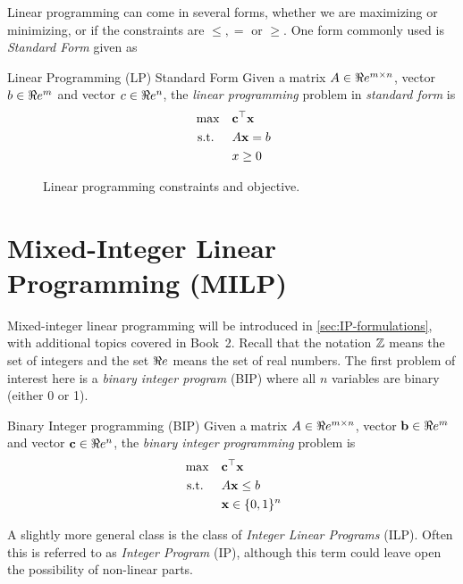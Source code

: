 Linear programming can come in several forms, whether we are maximizing or minimizing, or if the constraints are $\leq, =$ or $\geq$.   One form commonly used is \emph{Standard Form} given as 
\begin{general}{Linear Programming (LP) Standard Form}{\polynomial}
Given a matrix $A \in \Re e^{m\times n}$, vector $b \in \Re e^m$ and vector $c \in \Re e^n$, the \emph{linear programming} problem in \emph{standard form} is
\begin{equation}
\label{eq:standardLP}
\begin{split}
\max \quad & \mathbf{c}^\top \mathbf{x}\\
\mbox{ s.t. }  \quad & A\mathbf{x} = b\\
& x \geq 0
\end{split}
\end{equation}
\end{general}

\begin{figure}
\caption{Linear programming constraints and objective.}
\end{figure}

\section{Mixed-Integer Linear Programming (MILP)}
\label{sec:intro-MILP}
Mixed-integer linear programming will be introduced in \autoref{sec:IP-formulations}, with additional topics covered in Book~2.
Recall that the notation $\mathbb{Z}$ means the set of integers and the set $\Re e$ means the set of real numbers.  The first problem of interest here is a \emph{binary integer program} (BIP) where all $n$ variables are binary (either 0 or 1).

\begin{general}{Binary Integer programming (BIP)}{\npcomplete}
Given a matrix $A \in \Re e^{m\times n}$, vector $\mathbf{b} \in \Re e^m$ and vector $\mathbf{c} \in \Re e^n$, the \emph{binary integer programming} problem is
\begin{equation}
\label{eq:BIP}
\begin{split}
\max \quad & \mathbf{c}^\top \mathbf{x}\\
\mbox{ s.t. }  \quad & A\mathbf{x} \leq b\\
& \mathbf{x} \in \{0,1\}^n
\end{split}
\end{equation}
\end{general}
A slightly more general class is the class of \emph{Integer Linear Programs} (ILP).  Often this is referred to as \emph{Integer Program} (IP), although this term could leave open the possibility of non-linear parts.

